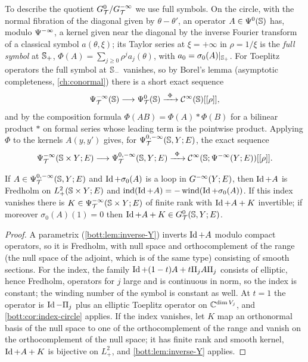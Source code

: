 To describe the quotient $G^{0}_{\mathcal{T}}/G^{-\infty}_{\mathcal{T}}$ we use full symbols. On the circle, with the
normal fibration of the diagonal given by $\theta-\theta'$, an operator
$A\in\Psi^{0}(\mathbb{S})$ has, modulo $\Psi^{-\infty}$, a kernel given near the diagonal by
the inverse Fourier transform of a classical symbol $a(\theta,\xi)$; its Taylor series at
$\xi=+\infty$ in $\rho=1/\xi$ is the \emph{full symbol} at $\mathbb{S}_+$,
$\Phi(A)=\sum_{j\ge0}\rho^ja_j(\theta)$, with $a_0=\sigma_0(A)|_{\mathbb{S}_+}$. For Toeplitz
operators the full symbol at $\mathbb{S}_-$ vanishes, so by Borel's lemma (asymptotic
completeness, \cref{ch:conormal}) there is a short exact sequence
\begin{equation*}
  \PsiT{-\infty}(\Sphere)\longrightarrow\PsiT{0}(\Sphere)\xrightarrow{\ \Phi\ }\CI(\Sphere)[[\rho]],
\end{equation*}
and by the composition formula $\Phi(AB)=\Phi(A)*\Phi(B)$ for a bilinear product $*$ on
formal series whose leading term is the pointwise product. Applying $\Phi$ to the kernels
$A(y,y')$ gives, for $\Psi^{0,-\infty}_{\mathcal{T}}(\mathbb{S},Y;E)$, the exact sequence
\begin{equation}\label{bott:eq:full-symbol}
  \PsiT{-\infty}(\Sphere\times Y;E)\longrightarrow\PsiT{0,-\infty}(\Sphere,Y;E)
  \xrightarrow{\ \Phi\ }\CI(\Sphere;\Psido{-\infty}(Y;E))[[\rho]].
\end{equation}

\begin{lemma}\label{bott:lem:index-Y}
  If $A\in\Psi^{0,-\infty}_{\mathcal{T}}(\mathbb{S},Y;E)$ and $\operatorname{Id}+\sigma_0(A)$ is a loop in $G^{-\infty}(Y;E)$, then
  $\operatorname{Id}+A$ is Fredholm on $L^2_+(\mathbb{S}\times Y;E)$ and $\operatorname{ind}(\operatorname{Id}+A)=-\operatorname{wind}(\operatorname{Id}+\sigma_0(A))$.
  If this index vanishes there is $K\in\Psi^{-\infty}_{\mathcal{T}}(\mathbb{S}\times Y;E)$ of finite rank with
  $\operatorname{Id}+A+K$ invertible; if moreover $\sigma_0(A)(1)=0$ then $\operatorname{Id}+A+K\in G^{0}_{\mathcal{T}}(\mathbb{S},Y;E)$.
\end{lemma}
\begin{proof}
  A parametrix (\cref{bott:lem:inverse-Y}) inverts $\operatorname{Id}+A$ modulo compact operators, so it is
  Fredholm, with null space and orthocomplement of the range (the null space of the
  adjoint, which is of the same type) consisting of smooth sections. For the index, the
  family $\operatorname{Id}+(1-t)A+t\Pi_jA\Pi_j$ consists of elliptic, hence Fredholm, operators for $j$
  large and is continuous in norm, so the index is constant; the winding number of the
  symbol is constant as well. At $t=1$ the operator is $\operatorname{Id}-\Pi_j$ plus an elliptic Toeplitz
  operator on $\mathbb{C}^{\dim V_j}$, and \cref{bott:cor:index-circle} applies. If the index
  vanishes, let $K$ map an orthonormal basis of the null space to one of the orthocomplement
  of the range and vanish on the orthocomplement of the null space; it has finite rank and
  smooth kernel, $\operatorname{Id}+A+K$ is bijective on $L^2_+$, and \cref{bott:lem:inverse-Y} applies.
\end{proof}


